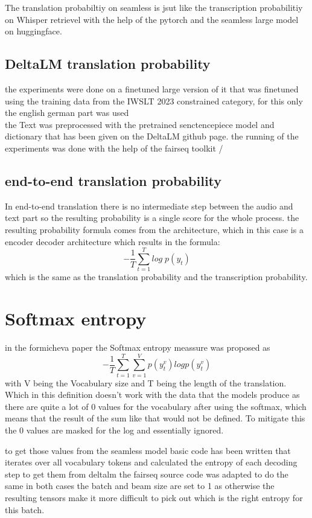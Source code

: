 The translation probabiltiy on seamless is jsut like the transcription probabilitiy on Whisper retrievel with the help of the pytorch and the seamless large model on huggingface. 


\subsection{DeltaLM translation probability}
the experiments \cite{ma2021deltalm} were done on a finetuned large version of it that was finetuned using the training data from the IWSLT 2023 constrained category, for this only the english german part was used
\\
the Text was preprocessed with the pretrained senctencepiece model and dictionary that has been given on the DeltaLM github page. 
the running of the experiments was done with the help of the fairseq toolkit \cite{ott2019fairseqfastextensibletoolkit}/\cite{ott2019fairseq}

\subsection{end-to-end translation probability}
In end-to-end translation there is no intermediate step between the audio and text part so the resulting probability is a single score for the whole process.
the resulting probability formula comes from the architecture, which in this case is a encoder decoder architecture which results in the formula: $$-\frac{1}{T}\sum_{t=1}^T log\; p(y_t)$$ which is the same as the translation probability and the transcription probability. 

\section{Softmax entropy}
in the formicheva \cite{fomicheva2020unsupervised} paper the Softmax entropy meassure was proposed as $$-\frac{1}{T}\sum_{t=1}^T\sum_{v=1}^Vp(y_t^v)logp(y_t^v) \label{formula:translation probability}$$ with V being the Vocabulary size and T being the length of the translation. Which in this definition doesn't work with the data that the models produce as there are quite a lot of 0 values for the vocabulary after using the softmax, which means that the result of the sum like that would not be defined. To mitigate this the 0 values are masked for the log and essentially ignored. 

to get those values from the seamless model basic code has been written that iterates over all vocabulary tokens and calculated the entropy of each decoding step
to get them from deltalm the fairseq source code was adapted to do the same
in both cases the batch and beam size are set to 1 as otherwise the resulting tensors make it more difficult to pick out which is the right entropy for this batch. 

